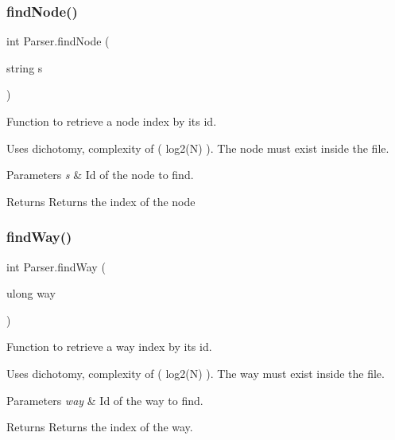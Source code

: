 \subsubsection{\texorpdfstring{find\+Node()}{findNode()}\hspace{0.1cm}{\footnotesize\ttfamily [2/2]}}
{\footnotesize\ttfamily int Parser.\+find\+Node (\begin{DoxyParamCaption}\item[{string}]{s }\end{DoxyParamCaption})\hspace{0.3cm}{\ttfamily [inline]}}



Function to retrieve a node index by its id. 

Uses dichotomy, complexity of ( log2(\+N) ). The node must exist inside the file.


\begin{DoxyParams}{Parameters}
{\em s} & Id of the node to find.\\
\hline
\end{DoxyParams}
\begin{DoxyReturn}{Returns}
Returns the index of the node
\end{DoxyReturn}
\mbox{\label{classParser_a0b51b15e7a8b0193be93d75074d23b24}} 
\subsubsection{\texorpdfstring{find\+Way()}{findWay()}\hspace{0.1cm}{\footnotesize\ttfamily [1/2]}}
{\footnotesize\ttfamily int Parser.\+find\+Way (\begin{DoxyParamCaption}\item[{ulong}]{way }\end{DoxyParamCaption})\hspace{0.3cm}{\ttfamily [inline]}}



Function to retrieve a way index by its id. 

Uses dichotomy, complexity of ( log2(\+N) ). The way must exist inside the file.


\begin{DoxyParams}{Parameters}
{\em way} & Id of the way to find.\\
\hline
\end{DoxyParams}
\begin{DoxyReturn}{Returns}
Returns the index of the way.
\end{DoxyReturn}
\mbox{\label{classParser_aa3df51fa8a42dbacf0eef33290fa5735}} 
